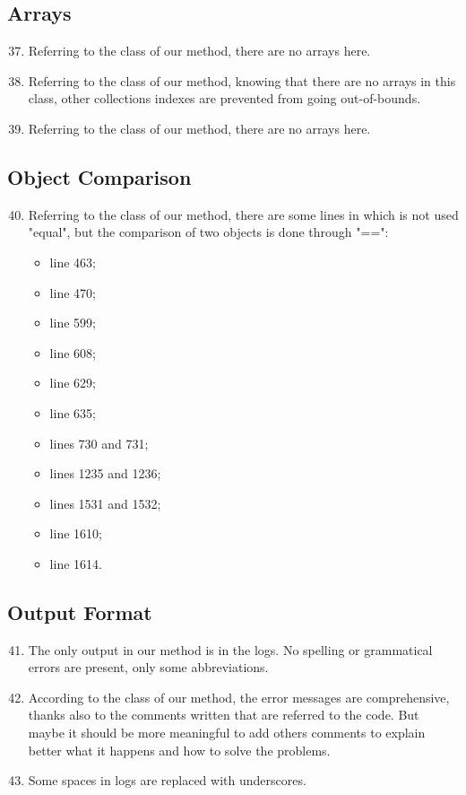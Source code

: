 \subsection{Arrays}
\begin{enumerate}
	\setcounter{enumi}{36}
	\item Referring to the class of our method, there are no arrays here.
	\item Referring to the class of our method, knowing that there are no arrays in this class, other collections indexes are prevented from going out-of-bounds.
	\item Referring to the class of our method, there are no arrays here.
\end{enumerate}
\subsection{Object Comparison}
\begin{enumerate}
	\setcounter{enumi}{39}
	\item Referring to the class of our method, there are some lines in which is not used "equal", but the comparison of two objects is done through "==": 
	    \begin{itemize}
	        \item line 463;
	        \item line 470;
	        \item line 599;
	        \item line 608;
	        \item line 629;
	        \item line 635;
	        \item lines 730 and 731;
	        \item lines 1235 and 1236;
	        \item lines 1531 and 1532;
	        \item line 1610;
	        \item line 1614.
	    \end{itemize}
\end{enumerate}
\subsection{Output Format}
\begin{enumerate}
	\setcounter{enumi}{40}
	\item The only output in our method is in the logs. No spelling or grammatical errors are present, only some abbreviations.
	\item According to the class of our method, the error messages are comprehensive, thanks also to the comments written that are referred to the code. But maybe it should be more meaningful to add others comments to explain better what it happens and how to solve the problems.
	\item Some spaces in logs are replaced with underscores.
\end{enumerate}
